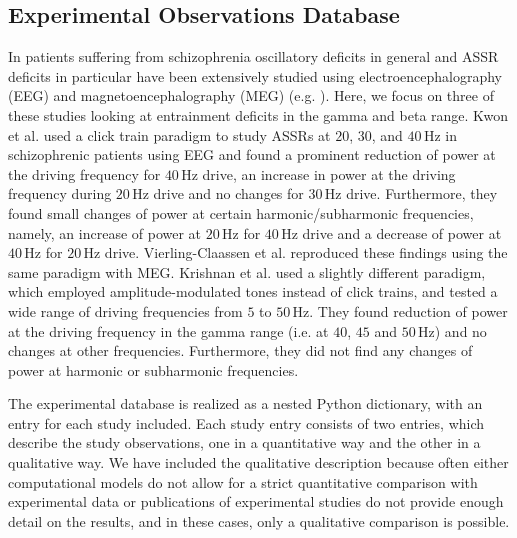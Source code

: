 \documentclass[a4paper,10pt]{article}
\begin{document}
\subsection{Experimental Observations Database}

In patients suffering from schizophrenia oscillatory deficits in general and ASSR deficits in particular have been extensively studied using electroencephalography (EEG) and 
magnetoencephalography (MEG) 
(e.g.  \cite{Kwon1999,Vierling2008,Krishnan2009,
Light2006,Zhang2016,Hamm2015,Brenner2003,Spencer2009b,Spencer2008,Spencer2012,OConnell2015, Mulert2011}). Here, we focus on three of these studies looking at
entrainment deficits in the gamma and beta range. Kwon et al. \cite{Kwon1999} used a click train paradigm to study ASSRs at $20$, $30$, and $40$\,Hz in schizophrenic
patients using EEG and found a prominent reduction of power at the driving frequency for $40$\,Hz drive, an increase in power at the driving frequency during $20$\,Hz drive and 
no changes for $30$\,Hz drive. Furthermore, they found small changes of power at certain harmonic/subharmonic frequencies, namely, an increase of power at $20$\,Hz for $40$\,Hz
drive and a decrease of power at $40$\,Hz for $20$\,Hz drive. Vierling-Claassen et al. \cite{Vierling2008} reproduced these findings using the same paradigm with MEG. 
Krishnan et al. \cite{Krishnan2009} used a slightly different paradigm, which employed amplitude-modulated tones instead of click trains, and tested a wide range of driving 
frequencies from $5$ to $50$\,Hz. They found reduction of power at the driving frequency in the gamma range (i.e. at $40$, $45$ and $50$\,Hz) and no changes at other frequencies.
Furthermore, they did not find any changes of power at harmonic or subharmonic frequencies. 

The experimental database is realized as a nested Python dictionary, with an entry for each study included.
Each study entry consists of two entries, which describe the study observations, one in a quantitative way and the other in a qualitative way.
We have included the qualitative description because often either computational models do not allow for a strict quantitative comparison with 
experimental data or publications of experimental studies do not provide enough detail on the results, and in these cases, only a qualitative comparison is possible. 
\end{document}
